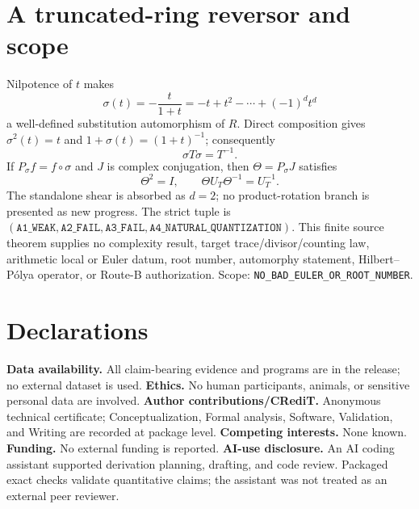 \documentclass[10pt]{article}
\begin{document}
\section{A truncated-ring reversor and scope}
Nilpotence of $t$ makes
\[
\sigma(t)=-\frac{t}{1+t}=-t+t^2-\cdots+(-1)^dt^d          \tag{9}
\]
a well-defined substitution automorphism of $R$.  Direct composition gives
$\sigma^2(t)=t$ and $1+\sigma(t)=(1+t)^{-1}$; consequently
\[
\sigma T\sigma=T^{-1}.                                    \tag{10}
\]
If $P_\sigma f=f\circ\sigma$ and $J$ is complex conjugation, then
$\Theta=P_\sigma J$ satisfies
\[
\Theta^2=I,\qquad \Theta U_T\Theta^{-1}=U_T^{-1}.          \tag{11}
\]
The standalone shear is absorbed as $d=2$; no product-rotation branch is
presented as new progress.  The strict tuple is
$(\texttt{A1\_WEAK},\texttt{A2\_FAIL},\texttt{A3\_FAIL},
\texttt{A4\_NATURAL\_QUANTIZATION})$.  This finite source theorem supplies
no complexity result, target trace/divisor/counting law, arithmetic local or
Euler datum, root number, automorphy statement, Hilbert--P\'olya operator, or
Route-B authorization.  Scope: \texttt{NO\_BAD\_EULER\_OR\_ROOT\_NUMBER}.

\section*{Declarations}
\textbf{Data availability.} All claim-bearing evidence and programs are in
the release; no external dataset is used.  \textbf{Ethics.} No human
participants, animals, or sensitive personal data are involved.
\textbf{Author contributions/CRediT.} Anonymous technical certificate;
Conceptualization, Formal analysis, Software, Validation, and Writing are
recorded at package level.  \textbf{Competing interests.} None known.
\textbf{Funding.} No external funding is reported.  \textbf{AI-use
disclosure.} An AI coding assistant supported derivation planning, drafting,
and code review.  Packaged exact checks validate quantitative claims; the
assistant was not treated as an external peer reviewer.
\end{document}
